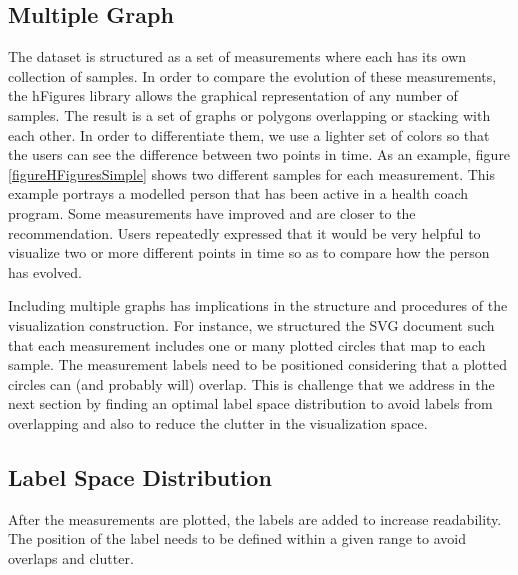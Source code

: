 \documentclass[twocolumn]{bmcart}%
\begin{document}
\subsection*{Multiple Graph}

The dataset is structured as a set of measurements where each has its own collection of samples. In order to compare the evolution of these measurements, the hFigures library allows the graphical representation of any number of samples. The result is a set of graphs or polygons overlapping or stacking with each other. In order to differentiate them, we use a lighter set of colors so that the users can see the difference between two points in time. As an example, figure \ref{figureHFiguresSimple} shows two different samples for each measurement. This example portrays a modelled person that has been active in a health coach program. Some measurements have improved and are closer to the recommendation. Users repeatedly expressed that it would be very helpful to visualize two or more different points in time so as to compare how the person has evolved. 

Including multiple graphs has implications in the structure and procedures of the visualization construction. For instance, we structured the SVG document such that each measurement includes one or many plotted circles that map to each sample. The measurement labels need to be positioned considering that a plotted circles can (and probably will) overlap. This is challenge that we address in the next section by finding an optimal label space distribution to avoid labels from overlapping and also to reduce the clutter in the visualization space.

\subsection*{Label Space Distribution}

After the measurements are plotted, the labels are added to increase readability. The position of the label needs to be defined within a given range to avoid overlaps and clutter.

\end{document}

